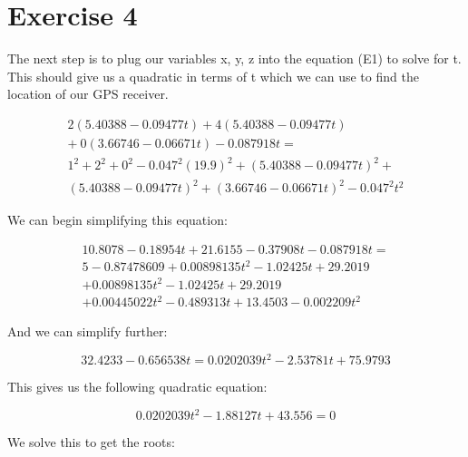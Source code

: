 \documentclass{article}
\begin{document}

\section*{Exercise 4}

The next step is to plug our variables x, y, z into the equation (E1) to solve for t.  This should give us a quadratic in terms of t which we can use to find the location of our GPS receiver.  

     \begin{align*}
    2(5.40388 - 0.09477t) + 4(5.40388 - 0.09477t) \\ + \ 0(3.66746 - 0.06671t) - 0.087918t = \\  
    1^{2} + 2^{2} + 0^{2} - 0.047^{2}(19.9)^{2} + (5.40388 - 0.09477t)^{2} + \\ (5.40388 - 0.09477t)^{2} + (3.66746 - 0.06671t)^{2} - 0.047^{2}t^{2}  
\end{align*} 

We can begin simplifying this equation:

     \begin{align*}
    10.8078 - 0.18954t + 21.6155 - 0.37908t - 0.087918t = \\
        5 - 0.87478609 
        + 0.00898135t^{2} - 1.02425t + 29.2019 \\
        + 0.00898135t^{2} - 1.02425t + 29.2019  \\
        + 0.00445022t^{2} - 0.489313t + 13.4503 
        - 0.002209 t^{2}
\end{align*} 

And we can simplify further:

  \begin{equation*}
    32.4233 - 0.656538t = 0.0202039t^2 - 2.53781t + 75.9793
\end{equation*} 

This gives us the following quadratic equation:

  \begin{equation*}
    0.0202039t^2 -1.88127 t + 43.556 = 0
\end{equation*} 

We solve this to get the roots:
\end{document}
